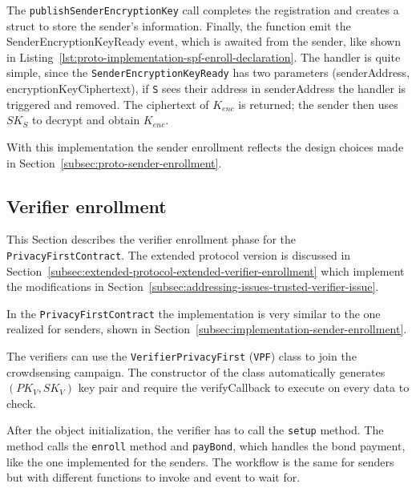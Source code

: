 The \lstinline{publishSenderEncryptionKey} call completes the registration and creates a struct to store the sender's information.
Finally, the function emit the SenderEncryptionKeyReady event, which is awaited from the sender, like shown in Listing~\ref{lst:proto-implementation-spf-enroll-declaration}.
The handler is quite simple, since the \lstinline{SenderEncryptionKeyReady} has two parameters (senderAddress, encryptionKeyCiphertext), if \texttt{S} sees their address in senderAddress the handler is triggered and removed.
The ciphertext of $K_{enc}$ is returned; the sender then uses $SK_S$ to decrypt and obtain $K_{enc}$.

With this implementation the sender enrollment reflects the design choices made in Section~\ref{subsec:proto-sender-enrollment}.

\subsection{Verifier enrollment}\label{subsec:implementation-verifier-enrollment}
This Section describes the verifier enrollment phase for the \texttt{PrivacyFirstContract}.
The extended protocol version is discussed in Section~\ref{subsec:extended-protocol-extended-verifier-enrollment} which implement the modifications in Section~\ref{subsec:addressing-issues-trusted-verifier-issue}.

In the \texttt{PrivacyFirstContract} the implementation is very similar to the one realized for senders, shown in Section~\ref{subsec:implementation-sender-enrollment}.

The verifiers can use the \texttt{VerifierPrivacyFirst} (\texttt{VPF}) class to join the crowdsensing campaign.
The constructor of the class automatically generates $(PK_V, SK_V)$ key pair and require the verifyCallback to execute on every data to check.

After the object initialization, the verifier has to call the \lstinline{setup} method.
The method calls the \lstinline{enroll} method and \lstinline{payBond}, which handles the bond payment, like the one implemented for the senders.
The workflow is the same for senders but with different functions to invoke and event to wait for.

